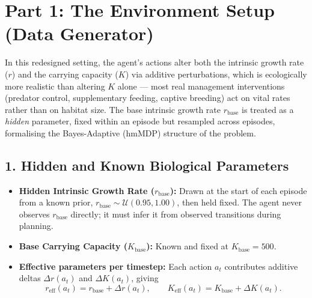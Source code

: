 \documentclass[11pt]{article}
\begin{document}

\section*{Part 1: The Environment Setup (Data Generator)}
In this redesigned setting, the agent's actions alter both the intrinsic growth rate ($r$) and the carrying capacity ($K$) via additive perturbations, which is ecologically more realistic than altering $K$ alone --- most real management interventions (predator control, supplementary feeding, captive breeding) act on vital rates rather than on habitat size. The base intrinsic growth rate $r_{\mathrm{base}}$ is treated as a \emph{hidden} parameter, fixed within an episode but resampled across episodes, formalising the Bayes-Adaptive (hmMDP) structure of the problem.

\subsection*{1. Hidden and Known Biological Parameters}\begin{itemize}
    \item \textbf{Hidden Intrinsic Growth Rate ($r_{\mathrm{base}}$):} Drawn at the start of each episode from a known prior, $r_{\mathrm{base}} \sim \mathcal{U}(0.95, 1.00)$, then held fixed. The agent never observes $r_{\mathrm{base}}$ directly; it must infer it from observed transitions during planning.
    \item \textbf{Base Carrying Capacity ($K_{\mathrm{base}}$):} Known and fixed at $K_{\mathrm{base}} = 500$.
    \item \textbf{Effective parameters per timestep:} Each action $a_t$ contributes additive deltas $\Delta r(a_t)$ and $\Delta K(a_t)$, giving
    \[
        r_{\mathrm{eff}}(a_t) = r_{\mathrm{base}} + \Delta r(a_t), \qquad K_{\mathrm{eff}}(a_t) = K_{\mathrm{base}} + \Delta K(a_t).
    \]
\end{itemize}
\end{document}
